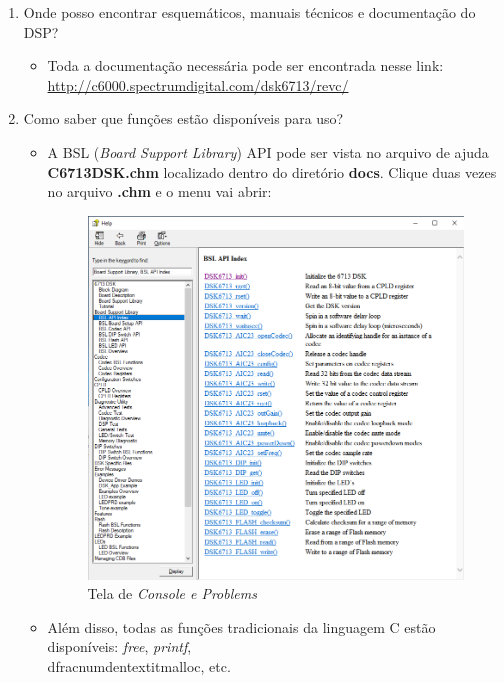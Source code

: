 \documentclass[a4paper, 12pt]{article}
\begin{document}
\begin{enumerate}
	\item Onde posso encontrar esquemáticos, manuais técnicos e documentação do DSP?
	
	\begin{itemize}
		\item Toda a documentação necessária pode ser encontrada nesse link:\\ \url{http://c6000.spectrumdigital.com/dsk6713/revc/}
	\end{itemize}
	
	\item Como saber que funções estão disponíveis para uso?
	
	\begin{itemize}
		\item A BSL (\textit{Board Support Library}) API pode ser vista no arquivo de ajuda \textbf{C6713DSK.chm} localizado dentro do diretório \textbf{docs}. Clique duas vezes no arquivo \textbf{.chm} e o menu vai abrir:
		
		\begin{figure}[!htbp] 
			\includegraphics[scale=0.45]{bsl.png}
			\caption{Tela de \textit{Console e Problems}}
			\label{Fig:dspbsl}
			
		\end{figure}
		
		\item Além disso, todas as funções tradicionais da linguagem C estão disponíveis: \textit{free}, \textit{printf}, \\dfrac{num}{den}textit{malloc}, etc.
		
	\end{itemize}
	
\end{enumerate}
\end{document}
